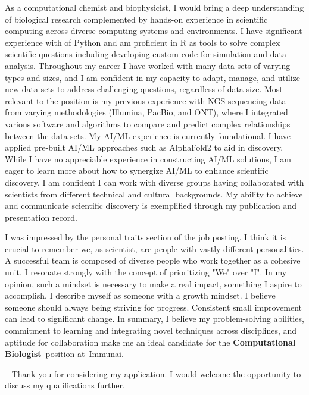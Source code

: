 \documentclass[11pt, a4paper]{awesome-cv}
\newcommand{\companyname}{Immunai}
\newcommand{\role}{Computational Biologist}
\newcommand{\brole}{\textbf{\role}}
\begin{document}
\begin{cvletter}
		As a computational chemist and biophysicist, I would bring a deep understanding of biological research complemented by hands-on experience in scientific computing across diverse computing systems and environments. %
		I have significant experience with of Python and am proficient in R as tools to solve complex scientific questions including developing custom code for simulation and data analysis.
		Throughout my career I have worked with many data sets of varying types and sizes, and I am confident in my capacity to adapt, manage, and utilize new data sets to address challenging questions, regardless of data size. 
		Most relevant to the position is my previous experience with NGS sequencing data from varying methodologies (Illumina, PacBio, and ONT), where I integrated various software and algorithms to compare and predict complex relationships between the data sets. 
		My AI/ML experience is currently foundational. I have applied pre-built AI/ML approaches such as AlphaFold2 to aid in discovery. While I have no appreciable experience in constructing AI/ML solutions, I am eager to learn more about how to synergize AI/ML to enhance scientific discovery.
		I am confident I can work with diverse groups having collaborated with scientists from different technical and cultural backgrounds.
		My ability to achieve and communicate scientific discovery is exemplified through my publication and presentation record.
		
		I was impressed by the personal traits section of the job posting. I think it is crucial to remember we, as scientist, are people with vastly different personalities. A successful team is composed of diverse people who work together as a cohesive unit. I resonate strongly with the concept of prioritizing "We" over "I". In my opinion, such a mindset is necessary to make a real impact, something I aspire to accomplish. I describe myself as someone with a growth mindset. I believe someone should always being striving for progress. Consistent small improvement can lead to significant change. 
		In summary, I believe my problem-solving abilities, commitment to learning and integrating novel techniques across disciplines, and aptitude for collaboration make me an ideal candidate for the \brole~position at~\companyname.
		
		~\newline
		Thank you for considering my application. I would welcome the opportunity to discuss my qualifications further.
	\end{cvletter}
	~\newline
	
	\makeletterclosing
\end{document}
